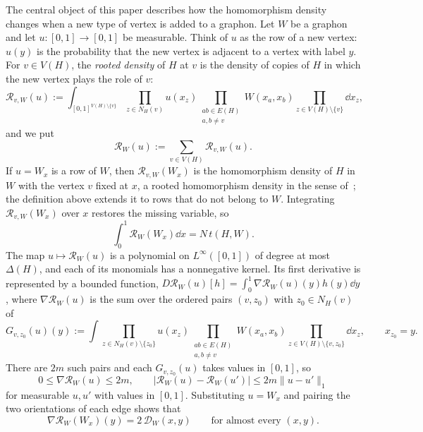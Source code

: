 The central object of this paper describes how the homomorphism density
changes when a new type of vertex is added to a graphon.  Let $W$ be a graphon
and let $u:[0,1]\to[0,1]$ be measurable.  Think of $u$ as the row of a new
vertex: $u(y)$ is the probability that the new vertex is adjacent to a vertex
with label $y$.  For $v\in V(H)$, the \emph{rooted density} of $H$ at $v$ is the
density of copies of $H$ in which the new vertex plays the role of $v$:
\begin{equation}\label{eq:rooted-density}
  \mathcal R_{v,W}(u):=\int_{[0,1]^{V(H)\setminus\{v\}}}
  \prod_{z\in N_H(v)}u(x_z)
  \prod_{\substack{ab\in E(H)\\ a,b\ne v}}W(x_a,x_b)
  \prod_{z\in V(H)\setminus\{v\}}\dd x_z,
\end{equation}
and we put
\begin{equation}\label{eq:total-rooted-density}
  \mathcal R_W(u):=\sum_{v\in V(H)}\mathcal R_{v,W}(u).
\end{equation}
If $u=W_x$ is a row of $W$, then $\mathcal R_{v,W}(W_x)$ is the homomorphism
density of $H$ in $W$ with the vertex $v$ fixed at $x$, a rooted homomorphism
density in the sense of~\cite{LovaszGraphLimits}; the definition above extends
it to rows that do not belong to $W$.  Integrating $\mathcal R_{v,W}(W_x)$ over
$x$ restores the missing variable, so
\begin{equation}\label{eq:rooted-average}
  \int_0^1\mathcal R_W(W_x)\dd x=N\,t(H,W).
\end{equation}
The map $u\mapsto\mathcal R_W(u)$ is a polynomial on $L^\infty([0,1])$ of
degree at most $\Delta(H)$, and each of its monomials has a nonnegative kernel.
Its first derivative is represented by a bounded function,
$D\mathcal R_W(u)[h]=\int_0^1\nabla\mathcal R_W(u)(y)h(y)\dd y$, where
$\nabla\mathcal R_W(u)$ is the sum over the ordered pairs $(v,z_0)$ with
$z_0\in N_H(v)$ of
\begin{equation}\label{eq:rooted-gradient}
  G_{v,z_0}(u)(y):=\int\prod_{z\in N_H(v)\setminus\{z_0\}}u(x_z)
  \prod_{\substack{ab\in E(H)\\ a,b\ne v}}W(x_a,x_b)
  \prod_{z\in V(H)\setminus\{v,z_0\}}\dd x_z,
  \qquad x_{z_0}=y.
\end{equation}
There are $2m$ such pairs and each $G_{v,z_0}(u)$ takes values in $[0,1]$, so
\begin{equation}\label{eq:rooted-lipschitz}
  0\le\nabla\mathcal R_W(u)\le2m,
  \qquad
  |\mathcal R_W(u)-\mathcal R_W(u')|\le2m\|u-u'\|_1
\end{equation}
for measurable $u,u'$ with values in $[0,1]$.  Substituting $u=W_x$ and pairing
the two orientations of each edge shows that
\begin{equation}\label{eq:rooted-gradient-derivative}
  \nabla\mathcal R_W(W_x)(y)=2\,\mathcal D_W(x,y)
  \qquad\text{for almost every }(x,y).
\end{equation}

